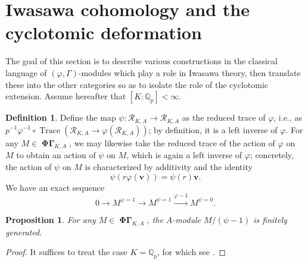 \documentclass[12pt]{amsart}
\newtheorem{prop}[theorem]{Proposition}
\theoremstyle{definition}
\newtheorem{defn}[theorem]{Definition}
\numberwithin{equation}{theorem}
\newcommand{\bv}{\mathbf{v}}
\newcommand{\QQ}{\mathbb{Q}}
\newcommand{\calR}{\mathcal{R}}
\DeclareMathOperator{\PhiGamma}{\mathbf{\Phi \Gamma}}
\DeclareMathOperator{\Trace}{Trace}
\begin{document}
\section{Iwasawa cohomology and the cyclotomic deformation}

The goal of this section is to describe various constructions in the classical language of $(\varphi, \Gamma)$-modules which play a role in Iwasawa theory, then translate these into the other categories so as to isolate the role of the cyclotomic extension.
Assume hereafter that $[K:\QQ_p] < \infty$.

\begin{defn} \label{D:psi}
Define the map $\psi: \calR_{K,A} \to \calR_{K,A}$ as the reduced trace of $\varphi$, i.e.,
as $p^{-1} \varphi^{-1} \circ \Trace(\calR_{K,A} \to \varphi(\calR_{K,A}))$;
by definition, it is a left inverse of $\varphi$. For any $M \in \PhiGamma_{K,A}$,
we may likewise take the reduced trace of the action of $\varphi$ on $M$ to obtain an action of $\psi$ on $M$, which is again a left inverse of $\varphi$;
concretely, the action of $\psi$ on $M$ is characterized by additivity and the identity
\[
\psi(r \varphi(\bv)) = \psi(r) \bv.
\]
We have an exact sequence
\begin{equation} \label{eq:psi sequence}
0 \to M^{\varphi=1} \to M^{\psi=1} \stackrel{\varphi-1}{\longrightarrow} M^{\psi=0}.
\end{equation}
\end{defn}

\begin{prop} \label{P:psi finite}
For any $M \in \PhiGamma_{K,A}$,
the $A$-module $M/(\psi-1)$ is finitely generated.
\end{prop}
\begin{proof}
It suffices to treat the case $K = \QQ_p$, for which see \cite[Proposition~3.3.2(1)]{kpx}.
\end{proof}
\end{document}
